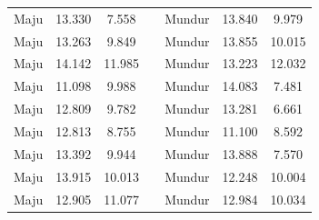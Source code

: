\begin{longtable}{|c|c|c|c|c|c|c|}
  Maju           & 13.330              & 7.558            &  & Mundur         & 13.840              & 9.979            \\ \cline{1-3} \cline{5-7} 
  Maju           & 13.263              & 9.849            &  & Mundur         & 13.855              & 10.015           \\ \cline{1-3} \cline{5-7} 
  Maju           & 14.142              & 11.985           &  & Mundur         & 13.223              & 12.032           \\ \cline{1-3} \cline{5-7} 
  Maju           & 11.098              & 9.988            &  & Mundur         & 14.083              & 7.481            \\ \cline{1-3} \cline{5-7} 
  Maju           & 12.809              & 9.782            &  & Mundur         & 13.281              & 6.661            \\ \cline{1-3} \cline{5-7} 
  Maju           & 12.813              & 8.755            &  & Mundur         & 11.100              & 8.592            \\ \cline{1-3} \cline{5-7} 
  Maju           & 13.392              & 9.944            &  & Mundur         & 13.888              & 7.570            \\ \cline{1-3} \cline{5-7} 
  Maju           & 13.915              & 10.013           &  & Mundur         & 12.248              & 10.004           \\ \cline{1-3} \cline{5-7} 
  Maju           & 12.905              & 11.077           &  & Mundur         & 12.984              & 10.034           \\ \cline{1-3} \cline{5-7} 
\end{longtable}

